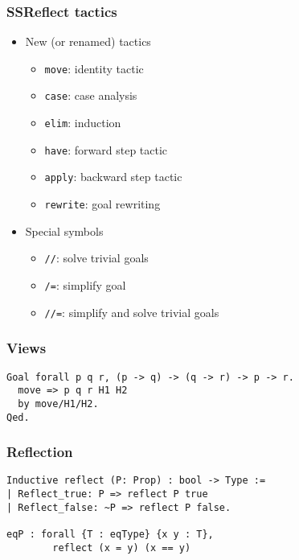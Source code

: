 \begin{frame}[fragile]
    \frametitle{SSReflect tactics}
    \begin{itemize}
        \item New (or renamed) tactics
            \begin{itemize}
            \item {\color{blue}\tt move}: identity tactic
            \item {\color{blue}\tt case}: case analysis
            \item {\color{blue}\tt elim}: induction
            \item {\color{blue}\tt have}: forward step tactic
            \item {\color{blue}\tt apply}: backward step tactic
            \item {\color{blue}\tt rewrite}: goal rewriting
            \end{itemize}
        \item Special symbols
            \begin{itemize}
                \item \verb|//|: solve trivial goals
                \item \verb|/=|: simplify goal
                \item \verb|//=|: simplify and solve trivial goals
            \end{itemize}
    \end{itemize}
\end{frame}

\begin{frame}[fragile]
    \frametitle{Views}
    \begin{verbatim}
Goal forall p q r, (p -> q) -> (q -> r) -> p -> r.
  move => p q r H1 H2
  by move/H1/H2.
Qed.
    \end{verbatim}
\end{frame}

\begin{frame}[fragile]
    \frametitle{Reflection}
    \begin{verbatim}
Inductive reflect (P: Prop) : bool -> Type :=
| Reflect_true: P => reflect P true
| Reflect_false: ~P => reflect P false.

eqP : forall {T : eqType} {x y : T},
        reflect (x = y) (x == y)
    \end{verbatim}
    
\end{frame}

